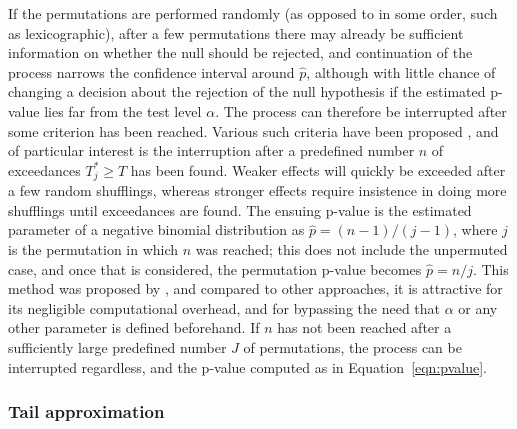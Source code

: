 If the permutations are performed randomly (as opposed to in some order, such as lexicographic), after a few permutations there may already be sufficient information on whether the null should be rejected, and continuation of the process narrows the confidence interval around $\hat{p}$, although with little chance of changing a decision about the rejection of the null hypothesis if the estimated p-value lies far from the test level $\alpha$. The process can therefore be interrupted after some criterion has been reached. Various such criteria have been proposed \citep{Andrews2000, Davidson2000, Fay2002, Fay2007, Gandy2009, Kim2010, Sandve2011, Gandy2013, Ruxton2013}, and of particular interest is the interruption after a predefined number $n$ of exceedances $T_j^{*} \geqslant T$ has been found. Weaker effects will quickly be exceeded after a few random shufflings, whereas stronger effects require insistence in doing more shufflings until exceedances are found. The ensuing p-value is the estimated parameter of a negative binomial distribution \citep{Haldane1945} as $\hat{p}=(n-1)/(j-1)$, where $j$ is the permutation in which $n$ was reached; this does not include the unpermuted case, and once that is considered, the permutation p-value becomes $\hat{p}=n/j$. This method was proposed by \citet{Besag1991}, and compared to other approaches, it is attractive for its negligible computational overhead, and for bypassing the need that $\alpha$ or any other parameter is defined beforehand. If $n$ has not been reached after a sufficiently large predefined number $J$ of permutations, the process can be interrupted regardless, and the p-value computed as in Equation~\ref{eqn:pvalue}.

\subsubsection{Tail approximation}

